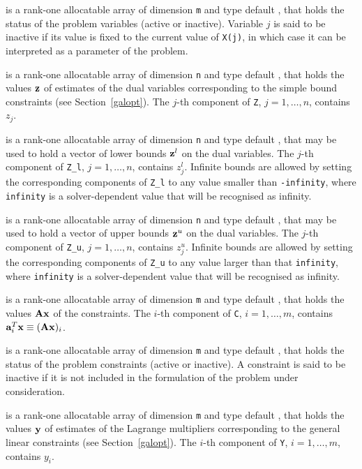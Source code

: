 \documentclass{galahad}
\begin{document}
\begin{description}
 is a rank-one allocatable array of dimension {\tt m} and type
default \integer, that holds the status of the problem variables (active or
inactive). Variable $j$ is said to be inactive if its value is fixed to the
current value of {\tt X(j)}, in which case it can be interpreted as a
parameter of the problem.

 is a rank-one allocatable array of dimension {\tt n} and type default
\realdp, that holds
the values ${\mathbf{z}}$ of estimates  of the dual variables
corresponding to the simple bound constraints (see Section~\ref{galopt}).
The $j$-th component of {\tt Z}, $j = 1,  \ldots ,  n$, contains $z_{j}$.

 is a rank-one allocatable array of dimension {\tt n} and type
default \realdp, that may be used to hold
a vector of lower bounds ${\mathbf{z}}^{l}$ on the dual variables.
The $j$-th component of {\tt Z\_l}, $j = 1, \ldots , n$,
contains $z_{j}^{l}$.
Infinite bounds are allowed by setting the corresponding
components of {\tt Z\_l} to any value smaller than {\tt -infinity},
where {\tt infinity} is a  solver-dependent value that will be recognised as
infinity.

 is a rank-one allocatable array of dimension {\tt n} and type
default \realdp, that may be used to hold
a vector of upper bounds ${\mathbf{z}}^{u}$ on the dual variables.
The $j$-th component of {\tt Z\_u}, $j = 1, \ldots , n$,
contains $z_{j}^{u}$.
Infinite bounds are allowed by setting the corresponding
components of {\tt Z\_u} to any value larger than that {\tt infinity},
where {\tt infinity} is a  solver-dependent value that will be recognised as
infinity.

 is a rank-one allocatable array of dimension {\tt m} and type default
\realdp, that holds
the values ${\mathbf{A}} {\mathbf{x}}$ of the constraints.
The $i$-th component of {\tt C}, $i = 1,  \ldots ,  m$, contains
${\mathbf{a}}_{i}^{T}{\mathbf{x}} \equiv ({\mathbf{A}} {\mathbf{x}})_{i}$.

 is a rank-one allocatable array of dimension {\tt m} and type
default \integer, that holds the status of the problem constraints (active or
inactive). A constraint is said to be inactive if it is not included in the
formulation of the problem under consideration.

 is a rank-one allocatable array of dimension {\tt m} and type
default \realdp, that holds
the values ${\mathbf{y}}$ of estimates  of the Lagrange multipliers
corresponding to the general linear constraints (see Section~\ref{galopt}).
The $i$-th component of {\tt Y}, $i = 1,  \ldots ,  m$, contains $y_{i}$.


\end{description}
\end{document}

